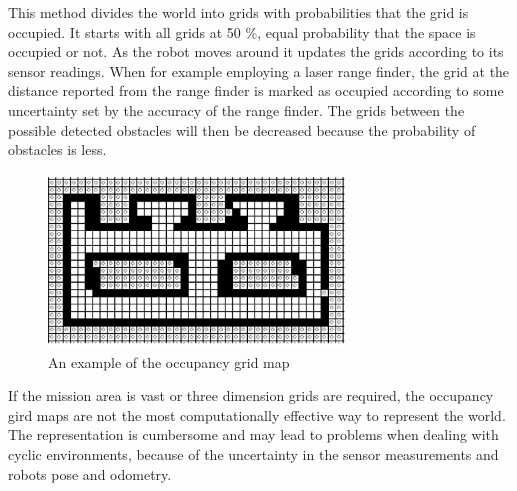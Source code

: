 This method divides the world into grids with probabilities that the grid is occupied. It
starts with all grids at 50 \%, equal probability that the space is occupied or not. As
the robot moves around it updates the grids according to its sensor readings. When for
example employing a laser range finder, the grid at the distance reported from the range
finder is marked as occupied according to some uncertainty set by the accuracy of the
range finder. The grids between the possible detected obstacles will then be decreased
because the probability of obstacles is less. 
\begin{figure}[htbp]
    \centering
    \includegraphics[width=0.7\textwidth]{pics/occupancy-grid}
    \caption{An example of the occupancy grid map}
    \label{chap2:fig-occupancy-grid}
\end{figure}

If the mission area is vast or three dimension grids are required, the occupancy gird maps 
are not the most computationally effective way to represent the world.
The representation is cumbersome and may lead to problems when dealing with
cyclic environments, because of the uncertainty in the sensor measurements and robots
pose and odometry. 


